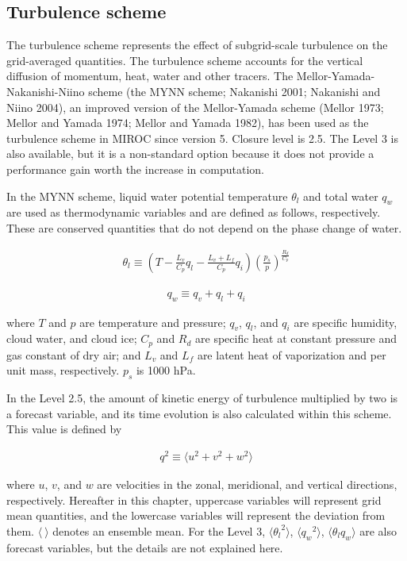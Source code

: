 \hypertarget{turbulence-scheme}{%
\subsection{Turbulence scheme}\label{turbulence-scheme}}

The turbulence scheme represents the effect of subgrid-scale turbulence
on the grid-averaged quantities. The turbulence scheme accounts for the
vertical diffusion of momentum, heat, water and other tracers. The
Mellor-Yamada-Nakanishi-Niino scheme (the MYNN scheme; Nakanishi 2001;
Nakanishi and Niino 2004), an improved version of the Mellor-Yamada
scheme (Mellor 1973; Mellor and Yamada 1974; Mellor and Yamada 1982),
has been used as the turbulence scheme in MIROC since version 5. Closure
level is 2.5. The Level 3 is also available, but it is a non-standard
option because it does not provide a performance gain worth the increase
in computation.

In the MYNN scheme, liquid water potential temperature \(\theta_l\) and
total water \(q_w\) are used as thermodynamic variables and are defined
as follows, respectively. These are conserved quantities that do not
depend on the phase change of water.

\begin{eqnarray} \theta_l \equiv \left(T - \frac{L_v}{C_p}q_l - \frac{L_v+L_f}{C_p}q_i \right) \left(\frac{p_s}{p}\right)^{\frac{R_d}{C_p}} \end{eqnarray}

\begin{eqnarray} q_w \equiv q_v+q_l+q_i \end{eqnarray}

where \(T\) and \(p\) are temperature and pressure; \(q_v\), \(q_l\),
and \(q_i\) are specific humidity, cloud water, and cloud ice; \(C_p\)
and \(R_d\) are specific heat at constant pressure and gas constant of
dry air; and \(L_v\) and \(L_f\) are latent heat of vaporization and per
unit mass, respectively. \(p_s\) is 1000 hPa.

In the Level 2.5, the amount of kinetic energy of turbulence multiplied
by two is a forecast variable, and its time evolution is also calculated
within this scheme. This value is defined by

\begin{eqnarray}q^2 \equiv \langle u^2 + v^2 + w^2 \rangle\end{eqnarray}

where \(u\), \(v\), and \(w\) are velocities in the zonal, meridional,
and vertical directions, respectively. Hereafter in this chapter,
uppercase variables will represent grid mean quantities, and the
lowercase variables will represent the deviation from them.
\(\langle \ \rangle\) denotes an ensemble mean. For the Level 3,
\(\langle {\theta_l}^2 \rangle\), \(\langle {q_w}^2 \rangle\),
\(\langle \theta_l q_w \rangle\) are also forecast variables, but the
details are not explained here.

